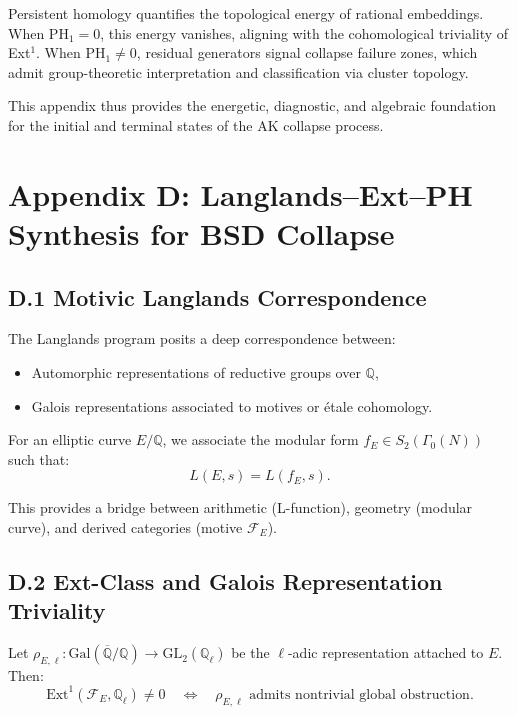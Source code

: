 Persistent homology quantifies the topological energy of rational embeddings.  
When \( \mathrm{PH}_1 = 0 \), this energy vanishes, aligning with the cohomological triviality of Ext$^1$.  
When \( \mathrm{PH}_1 \neq 0 \), residual generators signal collapse failure zones,  
which admit group-theoretic interpretation and classification via cluster topology.

This appendix thus provides the energetic, diagnostic, and algebraic foundation  
for the initial and terminal states of the AK collapse process.



\section*{Appendix D: Langlands--Ext--PH Synthesis for BSD Collapse}

\subsection*{D.1 Motivic Langlands Correspondence}

The Langlands program posits a deep correspondence between:
\begin{itemize}
  \item Automorphic representations of reductive groups over \( \mathbb{Q} \),
  \item Galois representations associated to motives or étale cohomology.
\end{itemize}

For an elliptic curve \( E/\mathbb{Q} \), we associate the modular form \( f_E \in S_2(\Gamma_0(N)) \) such that:
\[
L(E, s) = L(f_E, s).
\]

This provides a bridge between arithmetic (L-function), geometry (modular curve), and derived categories (motive \( \mathcal{F}_E \)).

\subsection*{D.2 Ext-Class and Galois Representation Triviality}

Let \( \rho_{E, \ell} : \mathrm{Gal}(\overline{\mathbb{Q}}/\mathbb{Q}) \to \mathrm{GL}_2(\mathbb{Q}_\ell) \) be the \(\ell\)-adic representation attached to \( E \).  
Then:
\[
\mathrm{Ext}^1(\mathcal{F}_E, \mathbb{Q}_\ell) \neq 0
\quad \Leftrightarrow \quad
\rho_{E,\ell} \text{ admits nontrivial global obstruction}.
\]


